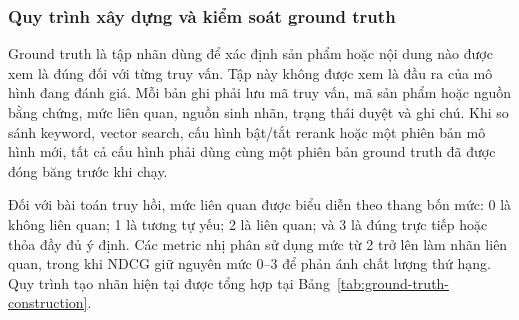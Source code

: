 \subsubsection{Quy trình xây dựng và kiểm soát ground truth}

Ground truth là tập nhãn dùng để xác định sản phẩm hoặc nội dung nào được xem là đúng đối với từng truy vấn. Tập này không được xem là đầu ra của mô hình đang đánh giá. Mỗi bản ghi phải lưu mã truy vấn, mã sản phẩm hoặc nguồn bằng chứng, mức liên quan, nguồn sinh nhãn, trạng thái duyệt và ghi chú. Khi so sánh keyword, vector search, cấu hình bật/tắt rerank hoặc một phiên bản mô hình mới, tất cả cấu hình phải dùng cùng một phiên bản ground truth đã được đóng băng trước khi chạy.

Đối với bài toán truy hồi, mức liên quan được biểu diễn theo thang bốn mức: 0 là không liên quan; 1 là tương tự yếu; 2 là liên quan; và 3 là đúng trực tiếp hoặc thỏa đầy đủ ý định. Các metric nhị phân sử dụng mức từ 2 trở lên làm nhãn liên quan, trong khi NDCG giữ nguyên mức 0--3 để phản ánh chất lượng thứ hạng. Quy trình tạo nhãn hiện tại được tổng hợp tại Bảng~\ref{tab:ground-truth-construction}.

